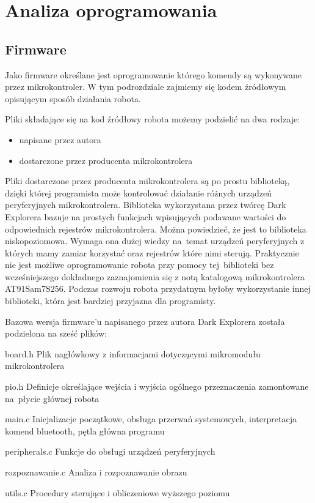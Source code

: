 \section{Analiza oprogramowania}
\subsection{Firmware}
Jako firmware określane jest oprogramowanie którego komendy są wykonywane przez
mikrokontroler. W tym podrozdziale zajmiemy się kodem źródłowym opisującym sposób
działania robota.

Pliki składające się na kod źródłowy robota możemy podzielić na dwa rodzaje:
\begin{itemize}
 \item napisane przez autora
 \item dostarczone przez producenta mikrokontrolera
\end{itemize}

Pliki dostarczone przez producenta mikrokontrolera są po prostu biblioteką,
dzięki której programista może kontrolować działanie różnych urządzeń
peryferyjnych mikrokontrolera. Biblioteka wykorzystana przez twórcę Dark
Explorera bazuje na prostych funkcjach wpisujących podawane wartości do
odpowiednich rejestrów mikrokontrolera. Można powiedzieć, że jest to biblioteka
niskopoziomowa. Wymaga ona dużej wiedzy na~temat urządzeń peryferyjnych z
których mamy zamiar korzystać oraz rejestrów które nimi sterują. Praktycznie
nie jest możliwe oprogramowanie robota przy pomocy tej~biblioteki bez
wcześniejszego dokładnego zaznajomienia się z notą katalogową mikrokontrolera
AT91Sam7S256. Podczas rozwoju robota przydatnym byłoby wykorzystanie innej
biblioteki, która jest bardziej przyjazna dla programisty.

Bazowa wersja firmware'u napisanego przez autora Dark Explorera została podzielona na sześć plików:
\begin{basedescript}{\desclabelstyle{\pushlabel}\desclabelwidth{40mm}}
\setlength{\parsep}{0pt}
\setlength{\itemsep}{0mm}
\setlength{\parskip}{0pt}
\item[board.h]
	Plik nagłówkowy z informacjami dotyczącymi mikromodułu mikrokontrolera
\item[pio.h] 
	Definicje określające wejścia i wyjścia ogólnego przeznaczenia zamontowane na~płycie głównej robota
\item[main.c] 
	Inicjalizacje początkowe, obsługa przerwań systemowych, interpretacja komend bluetooth, pętla główna programu
\item[peripherals.c] 
	Funkcje do obsługi urządzeń peryferyjnych
\item[rozpoznawanie.c] 
	Analiza i rozpoznawanie obrazu
\item[utils.c] 
	Procedury sterujące i obliczeniowe wyższego poziomu
\end{basedescript}

